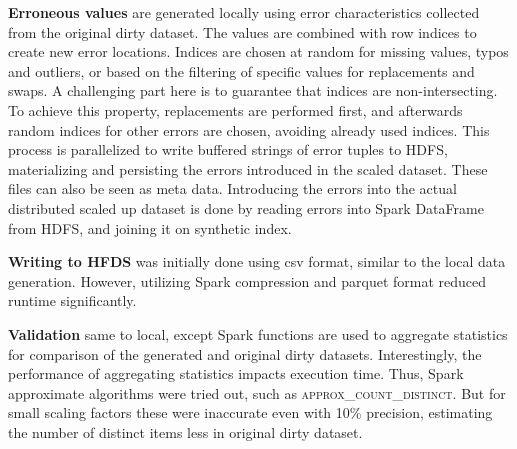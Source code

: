 \textbf{Erroneous values} are generated locally using error characteristics collected from the original dirty dataset.
The values are combined with row indices to create new error locations.
Indices are chosen at random for missing values, typos and outliers, or based on the filtering of specific values for replacements and swaps.
A challenging part here is to guarantee that indices are non-intersecting. 
To achieve this property, replacements are performed first, and afterwards random indices for other errors are chosen, avoiding already used indices.
This process is parallelized to write buffered strings of error tuples to HDFS, materializing and persisting the errors introduced in the scaled dataset.
These files can also be seen as meta data.
Introducing the errors into the actual distributed scaled up dataset is done by reading errors into Spark DataFrame from HDFS, and joining it on synthetic index.

\textbf{Writing to HFDS} was initially done using csv format, similar to the local data generation.
However, utilizing Spark compression and parquet format reduced runtime significantly.

\textbf{Validation} same to local, except Spark functions are used to aggregate statistics for comparison of the generated and original dirty datasets. 
Interestingly, the performance of aggregating statistics impacts execution time. 
Thus, Spark approximate algorithms were tried out, such as \textsc{approx\_count\_distinct}.
But for small scaling factors these were inaccurate even with 10\% precision, estimating the number of distinct items less in original dirty dataset.


